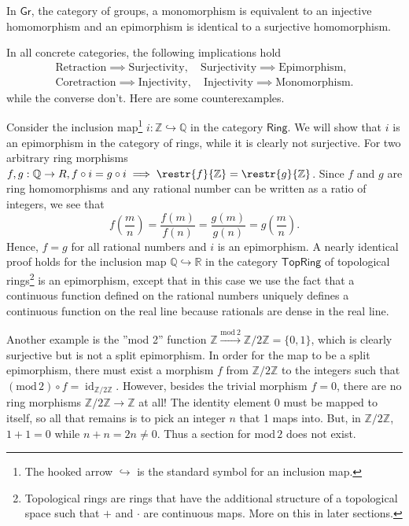 \documentclass[english,letterpaper]{article}%
\numberwithin{equation}{section}
\numberwithin{figure}{section}
\numberwithin{table}{section}
\theoremstyle{definition}
\theoremstyle{definition}
\theoremstyle{definition}
\theoremstyle{plain}
\theoremstyle{plain}
\theoremstyle{plain}
\theoremstyle{plain}
\theoremstyle{remark}
\theoremstyle{remark}
\DeclareMathOperator{\id}{id}
\begin{document}
%
\begin{prop}
In $\mathsf{Gr}$, the category of groups, a monomorphism is equivalent
to an injective homomorphism and an epimorphism is identical to a
surjective homomorphism.
\end{prop}
In all concrete categories, the following implications hold 
\begin{gather}
\text{Retraction}\implies\text{Surjectivity},\quad\text{Surjectivity}\implies\text{Epimorphism},\\
\text{Coretraction}\implies\text{Injectivity},\quad\text{Injectivity}\implies\text{Monomorphism.}
\end{gather}
while the converse don't. Here are some counterexamples. 
\begin{example}
Consider the inclusion map\footnote{The hooked arrow $\hookrightarrow$ is the standard symbol for an
inclusion map.} $i:\mathbb{Z}\hookrightarrow\mathbb{Q}$ in the category $\mathsf{Ring}$.
We will show that $i$ is an epimorphism in the category of rings,
while it is clearly not surjective. For two arbitrary ring morphisms
$f,g:\mathbb{Q}\rightarrow R,f\circ i=g\circ i\implies\restr{f}{\mathbb{Z}}=\restr{g}{\mathbb{Z}}$.
Since $f$ and $g$ are ring homomorphisms and any rational number
can be written as a ratio of integers, we see that 
\begin{equation}
f\left(\frac{m}{n}\right)=\frac{f(m)}{f(n)}=\frac{g(m)}{g(n)}=g\left(\frac{m}{n}\right).
\end{equation}
Hence, $f=g$ for all rational numbers and $i$ is an epimorphism.
A nearly identical proof holds for the inclusion map $\mathbb{Q}\hookrightarrow\mathbb{R}$
in the category $\mathsf{TopRing}$ of topological rings\footnote{Topological rings are rings that have the additional structure of
a topological space such that $+$ and $\cdot$ are continuous maps.
More on this in later sections.} is an epimorphism, except that in this case we use the fact that
a continuous function defined on the rational numbers uniquely defines
a continuous function on the real line because rationals are dense
in the real line.
\end{example}
%
\begin{example}
Another example is the ''mod 2'' function $\mathbb{Z}\xrightarrow{\text{mod}~2}\mathbb{Z}/2\mathbb{Z}=\{0,1\}$,
which is clearly surjective but is not a split epimorphism. In order
for the map to be a split epimorphism, there must exist a morphism
$f$ from $\mathbb{Z}/2\mathbb{Z}$ to the integers such that $\left(\text{mod}\,2\right)\circ f=\id_{\mathbb{Z}/2\mathbb{Z}}$.
However, besides the trivial morphism $f=0$, there are no ring morphisms
$\mathbb{Z}/2\mathbb{Z}\to\mathbb{Z}$ at all! The identity element
0 must be mapped to itself, so all that remains is to pick an integer
$n$ that 1 maps into. But, in $\mathbb{Z}/2\mathbb{Z}$, $1+1=0$
while $n+n=2n\ne0$. Thus a section for $\text{mod}\,2$ does not exist.
\end{example}
\end{document}
